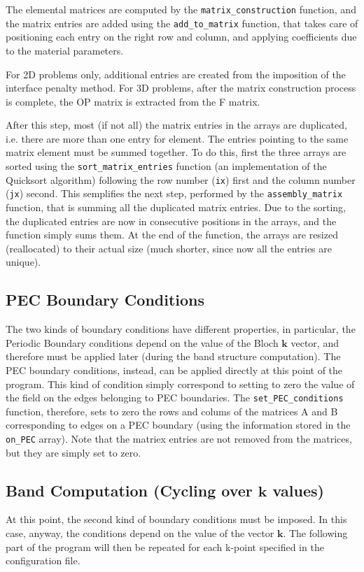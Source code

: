 \documentclass[11pt,a4paper,oneside]{article}
\begin{document}
The elemental matrices are computed by the {\tt matrix\_construction} function, and the matrix entries are added using the {\tt add\_to\_matrix} function, that takes care of positioning each entry on the right row and column, and applying coefficients due to the material parameters.

For 2D problems only, additional entries are created from the imposition of the interface penalty method. For 3D problems, after the matrix construction process is complete, the OP matrix is extracted from the F matrix.

After this step, most (if not all) the matrix entries in the arrays are duplicated, i.e. there are more than one entry for element. The entries pointing to the same matrix element must be summed together. To do this, first the three arrays are sorted using the {\tt sort\_matrix\_entries} function (an implementation of the Quicksort algorithm) following the row number ({\tt ix}) first and the column number ({\tt jx}) second. This semplifies the next step, performed by the {\tt assembly\_matrix} function, that is summing all the duplicated matrix entries. Due to the sorting, the duplicated entries are now in consecutive positions in the arrays, and the function simply sums them. At the end of the function, the arrays are resized (reallocated) to their actual size (much shorter, since now all the entries are unique).

\subsection{PEC Boundary Conditions}
The two kinds of boundary conditions have different properties, in particular, the Periodic Boundary conditions depend on the value of the Bloch $\boldsymbol{k}$ vector, and therefore must be applied later (during the band structure computation). The PEC boundary conditions, instead, can be applied directly at this point of the program. This kind of condition simply correspond to setting to zero the value of the field on the edges belonging to PEC boundaries. The {\tt set\_PEC\_conditions} function, therefore, sets to zero the rows and colums of the matrices A and B corresponding to edges on a PEC boundary (using the information stored in the {\tt on\_PEC} array). Note that the matriex entries are not removed from the matrices, but they are simply set to zero.

\subsection{Band Computation (Cycling over $\boldsymbol{k}$ values)}
At this point, the second kind of boundary conditions must be imposed. In this case, anyway, the conditions depend on the value of the vector $\boldsymbol{k}$. The following part of the program will then be repeated for each k-point specified in the configuration file.
\end{document}

